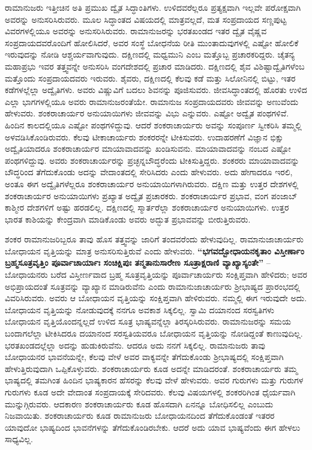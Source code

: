 ರಾಮಾನುಜರು ಇತ್ತೀಚಿನ ಅತಿ ಪ್ರಮುಖ ದ್ವೈತ ಸಿದ್ಧಾಂತಿಗಳು. ಉಳಿದವರೆಲ್ಲರೂ ಪ್ರತ್ಯಕ್ಷವಾಗಿ ಇಲ್ಲವೇ ಪರೋಕ್ಷವಾಗಿ ಅವರನ್ನು ಅನುಸರಿಸಿರುವರು. ಮೂಲ ಸಿದ್ಧಾಂತದ ವಿಷಯದಲ್ಲಿ ಮಾತ್ರವಲ್ಲದೆ, ಮತ ಸಂಪ್ರದಾಯದ ಸಣ್ಣಪುಟ್ಟ ವಿವರಗಳಲ್ಲಿಯೂ ಅವರನ್ನು ಅನುಸರಿಸಿರುವರು. ರಾಮಾನುಜರನ್ನು ಭರತಖಂಡದ ಇತರ ದ್ವೈತ ವೈಷ್ಣವ ಸಂಪ್ರದಾಯದವರೊಂದಿಗೆ ಹೋಲಿಸಿದರೆ, ಅವರ ಸಂಸ್ಥೆ ಬೋಧನೆಯ ರೀತಿ ಮುಂತಾದುವುಗಳಲ್ಲಿ ಎಷ್ಟೋ ಹೋಲಿಕೆ ಇರುವುದನ್ನು ನೋಡಿ ಆಶ್ಚರ್ಯವಾಗುವುದು. ದಕ್ಷಿಣದಲ್ಲಿ ಮಧ್ವಮುನಿ ಎಂಬ ಮತ್ತೊಬ್ಬ ಪ್ರಚಾರಕರಿದ್ದರು. ಚೈತನ್ಯ ಮಹಾಪ್ರಭು ಇವರ ತತ್ತ್ವವನ್ನೇ ಅನುಸರಿಸಿ ವಂಗದೇಶದಲ್ಲಿ ಪ್ರಚಾರ ಮಾಡಿದರು. ದಕ್ಷಿಣದಲ್ಲಿ ಶೈವ ವಿಶಿಷ್ಟಾದ್ವೈತಿಗಳೆಂಬ ಮತ್ತೊಂದು ಸಂಪ್ರದಾಯದವರು ಇರುವರು. ಶೈವರು, ದಕ್ಷಿಣದಲ್ಲಿ ಕೆಲವು ಕಡೆ ಮತ್ತು ಸಿಲೋನಿನಲ್ಲಿ ಬಿಟ್ಟು, ಇತರ ಕಡೆಗಳಲ್ಲೆಲ್ಲಾ ಅದ್ವೈತಿಗಳು. ಅವರು ವಿಷ್ಣುವಿಗೆ ಬದಲು ಶಿವನನ್ನು ಪೂಜಿಸುವರು. ಜೀವಸಿದ್ಧಾಂತದಲ್ಲಿ ಹೊರತು ಉಳಿದ ಎಲ್ಲಾ ಭಾಗಗಳಲ್ಲಿಯೂ ಅವರು ರಾಮಾನುಜರಂತೆಯೇ. ರಾಮಾನುಜ ಸಂಪ್ರದಾಯದವರು ಜೀವವನ್ನು ಅಣುವೆಂದು ಹೇಳುವರು. ಶಂಕರಾಚಾರ್ಯರ ಅನುಯಾಯಿಗಳು ಜೀವವನ್ನು ವಿಭು ಎನ್ನುವರು. ಎಷ್ಟೋ ಅದ್ವೈತ ಪಂಥಗಳಿವೆ. ಹಿಂದಿನ ಕಾಲದಲ್ಲಿಯೂ ಎಷ್ಟೋ ಪಂಥಗಳಿದ್ದುವು. ಆದರೆ ಶಂಕರಾಚಾರ್ಯರು ಅವನ್ನು ಸಂಪೂರ್ಣ ಸ್ವೀಕರಿಸಿ ತಮ್ಮಲ್ಲಿ ಅಳವಡಿಸಿಕೊಂಡಿರುವರು. ಕೆಲವು ಟೀಕಾಚಾರ್ಯರು ಶಂಕರರನ್ನೇ ಟೀಕಿಸುವರು. ಉದಾಹರಣೆಗೆ ವಿಜ್ಞಾನ ಭಿಕ್ಷು ಅದ್ವೈತಿಯಾದರೂ ಶಂಕರಾಚಾರ್ಯರ ಮಾಯಾವಾದವನ್ನು ಖಂಡಿಸುವನು. ಮಾಯಾವಾದವನ್ನು ನಂಬದ ಎಷ್ಟೋ ಪಂಥಗಳಿದ್ದುವು. ಅವರು ಶಂಕರಾಚಾರ್ಯರನ್ನು ಪ್ರಚ್ಛನ್ನಬೌದ್ಧರೆಂದು ಟೀಕಿಸುತ್ತಿದ್ದರು. ಶಂಕರರು ಮಾಯಾವಾದವನ್ನು ಬೌದ್ಧರಿಂದ ತೆಗೆದುಕೊಂಡು ಅದನ್ನು ವೇದಾಂತದಲ್ಲಿ ಸೇರಿಸಿದರು ಎಂದು ಹೇಳುವರು. ಅದು ಹೇಗಾದರೂ ಇರಲಿ, ಅಂತೂ ಈಗ ಅದ್ವೈತಿಗಳೆಲ್ಲರೂ ಶಂಕರಾಚಾರ್ಯರ ಅನುಯಾಯಿಗಳಾಗಿರುವರು. ದಕ್ಷಿಣ ಮತ್ತು ಉತ್ತರ ದೇಶಗಳಲ್ಲಿ ಶಂಕರಾಚಾರ್ಯರ ಅನುಯಾಯಿಗಳು ಪ್ರಖ್ಯಾತ ಅದ್ವೈತ ಪ್ರಚಾರಕರು. ಶಂಕರಾಚಾರ್ಯರ ಪ್ರಭಾವ, ವಂಗ ಪಂಜಾಬ್​ ಕಾಶ್ಮೀರ ದೇಶಗಳಿಗೆ ಅಷ್ಟು ಹರಡಲಿಲ್ಲ. ದಕ್ಷಿಣದಲ್ಲಿ ಸ್ಮಾರ್ತರೆಲ್ಲಾ ಶಂಕರಾಚಾರ್ಯರ ಅನುಯಾಯಿಗಳು. ಉತ್ತರ ಭಾರತ ಕಾಶಿಯನ್ನು ಕೇಂದ್ರವಾಗಿ ಮಾಡಿಕೊಂಡು ಅವರು ಅದ್ಭುತ ಪ್ರಭಾವವನ್ನು ಬೀರುತ್ತಿರುವರು.

ಶಂಕರ ರಾಮಾನುಜರಿಬ್ಬರೂ ತಾವು ಹೊಸ ತತ್ತ್ವವನ್ನು ಜಾರಿಗೆ ತಂದವರೆಂದು ಹೇಳುವುದಿಲ್ಲ. ರಾಮಾನುಜಾಚಾರ್ಯರು ಬೋಧಾಯನ ವೃತ್ತಿಯನ್ನು ಮಾತ್ರ ಅನುಸರಿಸುತ್ತಿರುವೆ ಎಂದು ಹೇಳುವರು. \textbf{“ಭಗವದ್ಬೋಧಾಯನಕೃತಾಂ ವಿಸ್ತೀರ್ಣಾಂ ಬ್ರಹ್ಮಸೂತ್ರವೃತ್ತಿಂ ಪೂರ್ವಾಚಾರ್ಯಾಃ ಸಂಚಿಕ್ಷಿಪುಃ ತನ್ಮತಾನುಸಾರೇಣ ಸೂತ್ರಾಕ್ಷರಾಣಿ ವ್ಯಾಖ್ಯಾಸ್ಯಂತೇ”} – ಬೋಧಾಯನರು ಬರೆದ ವಿಸ್ತೀರ್ಣವಾದ ಬ್ರಹ್ಮ ಸೂತ್ರವೃತ್ತಿಯನ್ನು ಪೂರ್ವಾಚಾರ್ಯರು ಸಂಕ್ಷಿಪ್ತವಾಗಿ ಹೇಳಿದರು; ಅವರ ಅಭಿಪ್ರಾಯದಂತೆ ಸೂತ್ರವನ್ನು ವ್ಯಾಖ್ಯಾನ ಮಾಡಿರುವೆನು ಎಂದು ರಾಮಾನುಜಾಚಾರ್ಯರು ಶ‍್ರೀಭಾಷ್ಯದ ಪ್ರಾರಂಭದಲ್ಲಿ ವಿವರಿಸಿರುವರು. ಅವರು ಆ ಬೋಧಾಯನ ವೃತ್ತಿಯನ್ನು ಸಂಕ್ಷಿಪ್ತವಾಗಿ ಹೇಳಿರುವರು. ನಮ್ಮಲ್ಲಿ ಈಗ ಇರುವುದೇ ಅದು. ಬೋಧಾಯನ ವೃತ್ತಿಯನ್ನು ನೋಡುವುದಕ್ಕೆ ನನಗೂ ಅವಕಾಶ ಸಿಕ್ಕಲಿಲ್ಲ. ಸ್ವಾಮಿ ದಯಾನಂದ ಸರಸ್ವತಿಗಳು ಬೋಧಾಯನ ವೃತ್ತಿಯೊಂದನ್ನಲ್ಲದೆ ಉಳಿದ ಸೂತ್ರ ಭಾಷ್ಯವನ್ನೆಲ್ಲಾ ತಿರಸ್ಕರಿಸಿರುವರು. ರಾಮಾನುಜರನ್ನು ಸಮಯ ಬಂದಾಗಲೆಲ್ಲಾ ಟೀಕಿಸಿದರೂ ದಯಾನಂದ ಸರಸ್ವತಿಯವರೂ ಬೋಧಾಯನ ವೃತ್ತಿಯನ್ನು ನೋಡಿದ್ದಂತೆ ಕಾಣುವುದಿಲ್ಲ. ಭರತಖಂಡದಲ್ಲೆಲ್ಲಾ ಅದನ್ನು ಹುಡುಕಿರುವೆನು. ಆದರೂ ಅದು ನನಗೆ ಸಿಕ್ಕಲಿಲ್ಲ. ರಾಮಾನುಜರು ತಾವು ಬೋಧಾಯನರ ಭಾವನೆಯನ್ನೇ, ಕೆಲವು ವೇಳೆ ಅವರ ವಾಕ್ಯವನ್ನೇ ತೆಗೆದುಕೊಂಡು ಶ‍್ರೀಭಾಷ್ಯದಲ್ಲಿ ಸಂಕ್ಷಿಪ್ತವಾಗಿ ಹೇಳುತ್ತಿರುವುದಾಗಿ ಒಪ್ಪಿಕೊಳ್ಳುವರು. ಶಂಕರಾಚಾರ್ಯರು ಕೂಡ ಅದನ್ನೇ ಮಾಡಿದರಂತೆ. ಶಂಕರಾಚಾರ್ಯರು ತಮ್ಮ ಭಾಷ್ಯದಲ್ಲಿ ತಮಗಿಂತ ಹಿಂದಿನ ಭಾಷ್ಯಕಾರನ ಹೆಸರನ್ನು ಕೆಲವು ವೇಳೆ ಹೇಳುವರು. ಅವರ ಗುರುಗಳು ಮತ್ತು ಗುರುಗಳ ಗುರುಗಳು ಕೂಡ ಅದೇ ವೇದಾಂತ ಸಂಪ್ರದಾಯಕ್ಕೆ ಸೇರಿದವರು. ಕೆಲವು ವಿಷಯಗಳಲ್ಲಿ ಶಂಕರರಿಗಿಂತ ಧೈರ್ಯವಾಗಿ ಮುನ್ನುಗ್ಗಿರುವರು. ಆದಕಾರಣ ಶಂಕರಾಚಾರ್ಯರು ಕೂಡ ಹೊಸದಾಗಿ ಏನನ್ನೂ ಬೋಧಿಸಲಿಲ್ಲ ಎಂಬುದು ನಿಜವಾಯಿತು. ಶಂಕರಾಚಾರ್ಯರು ಕೂಡ ರಾಮಾನುಜರು ಬೋಧಾಯನದಿಂದ ತೆಗೆದುಕೊಂಡಂತೆ ಇತರರ ಯಾವುದೋ ಭಾಷ್ಯದಿಂದ ಭಾವನೆಗಳನ್ನು ತೆಗೆದುಕೊಂಡಿರಬೇಕು. ಆದರೆ ಅದು ಯಾವ ಭಾಷ್ಯವೆಂದು ಈಗ ಹೇಳಲು ಸಾಧ್ಯವಿಲ್ಲ.

